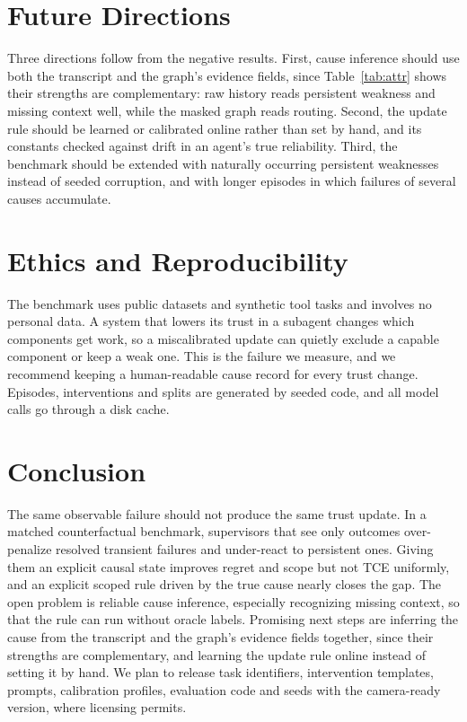 \documentclass[letterpaper]{article}
\begin{document}
\section{Future Directions}
Three directions follow from the negative results. First, cause inference should use both the transcript and the graph's evidence fields, since Table~\ref{tab:attr} shows their strengths are complementary: raw history reads persistent weakness and missing context well, while the masked graph reads routing. Second, the update rule should be learned or calibrated online rather than set by hand, and its constants checked against drift in an agent's true reliability. Third, the benchmark should be extended with naturally occurring persistent weaknesses instead of seeded corruption, and with longer episodes in which failures of several causes accumulate.

\section{Ethics and Reproducibility}
The benchmark uses public datasets and synthetic tool tasks and involves no personal data. A system that lowers its trust in a subagent changes which components get work, so a miscalibrated update can quietly exclude a capable component or keep a weak one. This is the failure we measure, and we recommend keeping a human-readable cause record for every trust change. Episodes, interventions and splits are generated by seeded code, and all model calls go through a disk cache.

\section{Conclusion}
The same observable failure should not produce the same trust update. In a matched counterfactual benchmark, supervisors that see only outcomes over-penalize resolved transient failures and under-react to persistent ones. Giving them an explicit causal state improves regret and scope but not TCE uniformly, and an explicit scoped rule driven by the true cause nearly closes the gap. The open problem is reliable cause inference, especially recognizing missing context, so that the rule can run without oracle labels. Promising next steps are inferring the cause from the transcript and the graph's evidence fields together, since their strengths are complementary, and learning the update rule online instead of setting it by hand. We plan to release task identifiers, intervention templates, prompts, calibration profiles, evaluation code and seeds with the camera-ready version, where licensing permits.

\clearpage

\end{document}
